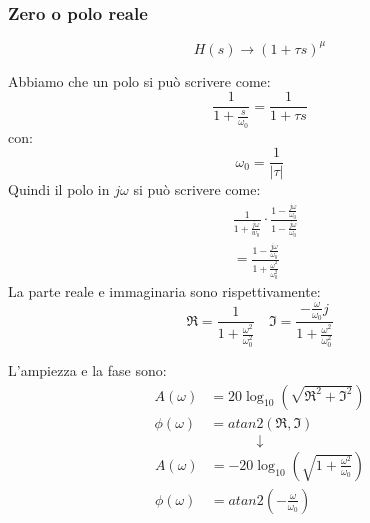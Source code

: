 \documentclass[a4paper]{article}
\begin{document}
\subsubsection{Zero o polo reale}
\[
  H(s) \to \left( 1 + \tau s \right)^{\mu}
\]
\begin{figure}[H]
  \centering
\end{figure}
Abbiamo che un polo si può scrivere come:
\[
\frac{1}{1 + \frac{s}{\omega_0}} = \frac{1}{1 + \tau s}
\] 
con:
\[
\omega_0 = \frac{1}{|\tau|}
\] 
Quindi il polo in \( j \omega \) si può scrivere come:
\[
  \begin{aligned}
    &\frac{1}{1 + \frac{j \omega}{w_0}}\cdot \frac{1 - \frac{j \omega}{\omega_0}}{1 - \frac{j \omega}{\omega_0}}\\
    &= \frac{1 - \frac{j \omega}{\omega_0}}{1 + \frac{\omega^2}{\omega_0^2}}
  \end{aligned}
\] 
La parte reale e immaginaria sono rispettivamente:
\[
  \Re = \frac{1}{1 + \frac{\omega^2}{\omega_0^2}} \quad \Im = \frac{-\frac{\omega}{\omega_0}j}{1 + \frac{\omega^2}{\omega_0^2}}
\] 

\begin{definition}
  L'ampiezza e la fase sono:
  \[
    \begin{aligned}
      A(\omega) &= 20 \log_{10} \left( \sqrt{\Re^2 + \Im^2} \right)\\
      \phi(\omega) &= atan2\left( \Re, \Im \right)
    \end{aligned}
  \] 
  \[
    \downarrow
  \] 
  \[
    \begin{aligned}
      A(\omega) &= -20 \log_{10} \left( \sqrt{1 + \frac{\omega^2}{\omega_0}} \right)\\
      \phi(\omega) &= atan2\left( -\frac{\omega}{\omega_0} \right)
    \end{aligned}
  \] 
\end{definition}
\end{document}
